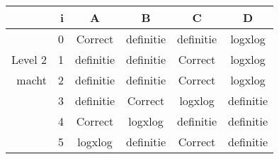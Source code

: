 \begin{tabular}{ rr| c|c|c|c}\hline\hline
     & i & \textbf{A} & \textbf{B} & \textbf{C} & \textbf{D}\\\hline

&0&Correct\cellcolor[gray]{0.6}&definitie&definitie&logxlog\\
Level 2 & 1&definitie&definitie&Correct\cellcolor[gray]{0.6}&logxlog\\
macht &2&definitie&definitie&Correct\cellcolor[gray]{0.6}&logxlog\\
&3&definitie&Correct\cellcolor[gray]{0.6}&logxlog&definitie\\
&4&Correct\cellcolor[gray]{0.6}&logxlog&definitie&definitie\\
&5&logxlog&definitie&Correct\cellcolor[gray]{0.6}&definitie\\
\hline\end{tabular}\par\ \newline

